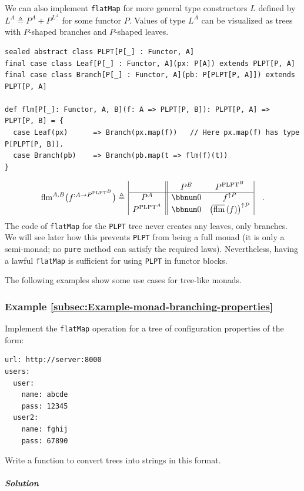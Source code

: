 We can also implement \lstinline!flatMap! for more general type constructors
$L$ defined by $L^{A}\triangleq P^{A}+P^{L^{A}}$ for some functor
$P$. Values of type $L^{A}$ can be visualized as trees with $P$-shaped
branches and $P$-shaped leaves.
\begin{lstlisting}
sealed abstract class PLPT[P[_] : Functor, A]
final case class Leaf[P[_] : Functor, A](px: P[A]) extends PLPT[P, A]
final case class Branch[P[_] : Functor, A](pb: P[PLPT[P, A]]) extends PLPT[P, A]

def flm[P[_]: Functor, A, B](f: A => PLPT[P, B]): PLPT[P, A] => PLPT[P, B] = {
  case Leaf(px)      => Branch(px.map(f))   // Here px.map(f) has type P[PLPT[P, B]].
  case Branch(pb)    => Branch(pb.map(t => flm(f)(t))
}
\end{lstlisting}
\[
\text{flm}^{A,B}\big(f^{:A\rightarrow P^{\text{PLPT}^{B}}}\big)\triangleq\,\begin{array}{|c||cc|}
 & P^{B} & P^{\text{PLPT}^{B}}\\
\hline P^{A} & \bbnum 0 & f^{\uparrow P}\\
P^{\text{PLPT}^{A}} & \bbnum 0 & \big(\overline{\text{flm}}\,(f)\big)^{\uparrow P}
\end{array}\quad.
\]
The code of \lstinline!flatMap! for the \lstinline!PLPT! tree never
creates any leaves, only branches. We will see later how this prevents
\lstinline!PLPT! from being a full monad (it is only a semi-monad;
no \lstinline!pure! method can satisfy the required laws). Nevertheless,
having a lawful \lstinline!flatMap! is sufficient for using \lstinline!PLPT!
in functor blocks.

The following examples show some use cases for tree-like monads.

\subsubsection{Example \label{subsec:Example-monad-branching-properties}\ref{subsec:Example-monad-branching-properties}}

Implement the \lstinline!flatMap! operation for a tree of configuration
properties of the form:
\begin{lstlisting}[language=bash]
url: http://server:8000
users:
  user:
    name: abcde
    pass: 12345
  user2:
    name: fghij
    pass: 67890
\end{lstlisting}
Write a function to convert trees into strings in this format.

\subparagraph{Solution}

